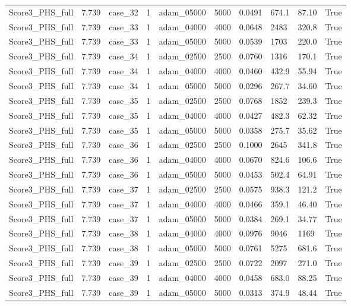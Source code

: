 \begin{longtable}{llllllllll}
Score3\_PHS\_full & 7.739 & case\_32 & 1 & adam\_05000 & 5000 & 0.0491 & 674.1 & 87.10 & True \\
Score3\_PHS\_full & 7.739 & case\_33 & 1 & adam\_04000 & 4000 & 0.0648 & 2483 & 320.8 & True \\
Score3\_PHS\_full & 7.739 & case\_33 & 1 & adam\_05000 & 5000 & 0.0539 & 1703 & 220.0 & True \\
Score3\_PHS\_full & 7.739 & case\_34 & 1 & adam\_02500 & 2500 & 0.0760 & 1316 & 170.1 & True \\
Score3\_PHS\_full & 7.739 & case\_34 & 1 & adam\_04000 & 4000 & 0.0460 & 432.9 & 55.94 & True \\
Score3\_PHS\_full & 7.739 & case\_34 & 1 & adam\_05000 & 5000 & 0.0296 & 267.7 & 34.60 & True \\
Score3\_PHS\_full & 7.739 & case\_35 & 1 & adam\_02500 & 2500 & 0.0768 & 1852 & 239.3 & True \\
Score3\_PHS\_full & 7.739 & case\_35 & 1 & adam\_04000 & 4000 & 0.0427 & 482.3 & 62.32 & True \\
Score3\_PHS\_full & 7.739 & case\_35 & 1 & adam\_05000 & 5000 & 0.0358 & 275.7 & 35.62 & True \\
Score3\_PHS\_full & 7.739 & case\_36 & 1 & adam\_02500 & 2500 & 0.1000 & 2645 & 341.8 & True \\
Score3\_PHS\_full & 7.739 & case\_36 & 1 & adam\_04000 & 4000 & 0.0670 & 824.6 & 106.6 & True \\
Score3\_PHS\_full & 7.739 & case\_36 & 1 & adam\_05000 & 5000 & 0.0453 & 502.4 & 64.91 & True \\
Score3\_PHS\_full & 7.739 & case\_37 & 1 & adam\_02500 & 2500 & 0.0575 & 938.3 & 121.2 & True \\
Score3\_PHS\_full & 7.739 & case\_37 & 1 & adam\_04000 & 4000 & 0.0466 & 359.1 & 46.40 & True \\
Score3\_PHS\_full & 7.739 & case\_37 & 1 & adam\_05000 & 5000 & 0.0384 & 269.1 & 34.77 & True \\
Score3\_PHS\_full & 7.739 & case\_38 & 1 & adam\_04000 & 4000 & 0.0976 & 9046 & 1169 & True \\
Score3\_PHS\_full & 7.739 & case\_38 & 1 & adam\_05000 & 5000 & 0.0761 & 5275 & 681.6 & True \\
Score3\_PHS\_full & 7.739 & case\_39 & 1 & adam\_02500 & 2500 & 0.0722 & 2097 & 271.0 & True \\
Score3\_PHS\_full & 7.739 & case\_39 & 1 & adam\_04000 & 4000 & 0.0458 & 683.0 & 88.25 & True \\
Score3\_PHS\_full & 7.739 & case\_39 & 1 & adam\_05000 & 5000 & 0.0313 & 374.9 & 48.44 & True \\

\end{longtable}
